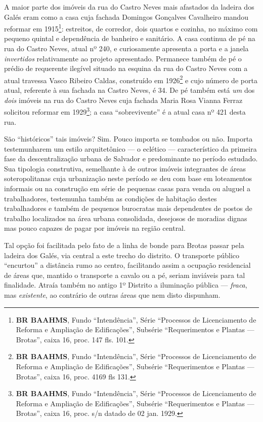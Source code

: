 A maior parte dos imóveis da rua do Castro Neves mais afastados da ladeira dos Galés eram como a casa cuja fachada Domingos Gonçalves Cavalheiro mandou reformar em 1915\footnote{\textbf{BR BAAHMS}, Fundo ``Intendência'', Série ``Processos de Licenciamento de Reforma e Ampliação de Edificações'', Subsérie ``Requerimentos e Plantas --- Brotas'', caixa 16, proc. 147 fls. 101.}: estreitos, de corredor, dois quartos e cozinha, no máximo com pequeno quintal e dependência de banheiro e sanitário. A casa continua de pé na rua do Castro Neves, atual nº 240, e curiosamente apresenta a porta e a janela \textit{invertidos} relativamente ao projeto apresentado. Permanece também de pé o prédio de requerente ilegível situado na esquina da rua do Castro Neves com a atual travessa Vasco Ribeiro Caldas, construído em 1926\footnote{\textbf{BR BAAHMS}, Fundo ``Intendência'', Série ``Processos de Licenciamento de Reforma e Ampliação de Edificações'', Subsérie ``Requerimentos e Plantas --- Brotas'', caixa 16, proc. 4169 fls 131.} e cujo número de porta atual, referente à sua fachada na Castro Neves, é 34. De pé também está \textit{um} dos \textit{dois} imóveis na rua do Castro Neves cuja fachada Maria Rosa Vianna Ferraz solicitou reformar em 1929\footnote{\textbf{BR BAAHMS}, Fundo ``Intendência'', Série ``Processos de Licenciamento de Reforma e Ampliação de Edificações'', Subsérie ``Requerimentos e Plantas --- Brotas'', caixa 16, proc. s/n datado de 02 jan. 1929.}; a casa ``sobrevivente'' é a atual casa nº 421 desta rua.

São ``históricos'' tais imóveis? Sim. Pouco importa se tombados ou não. Importa testemunharem um estilo arquitetônico --- o eclético --- característico da primeira fase da descentralização urbana de Salvador e predominante no período estudado. Sua tipologia construtiva, semelhante à de outros imóveis integrantes de áreas soteropolitanas cuja urbanização neste período se deu com base em loteamentos informais ou na construção em série de pequenas casas para venda ou aluguel a trabalhadores, testemunha também as condições de habitação destes trabalhadores e também de pequenos burocratas mais dependentes de postos de trabalho localizados na área urbana consolidada, desejosos de moradias dignas mas pouco capazes de pagar por imóveis na região central.


Tal opção foi facilitada pelo fato de a linha de bonde para Brotas passar pela ladeira dos Galés, via central a este trecho do distrito. O transporte público ``encurtou'' a distância rumo ao centro, facilitando assim a ocupação residencial de áreas que, mantido o transporte a cavalo ou a pé, seriam inviáveis para tal finalidade. Atraía também no antigo 1º Distrito a iluminação pública --- \textit{fraca}, mas \textit{existente}, ao contrário de outras áreas que nem disto dispunham.

